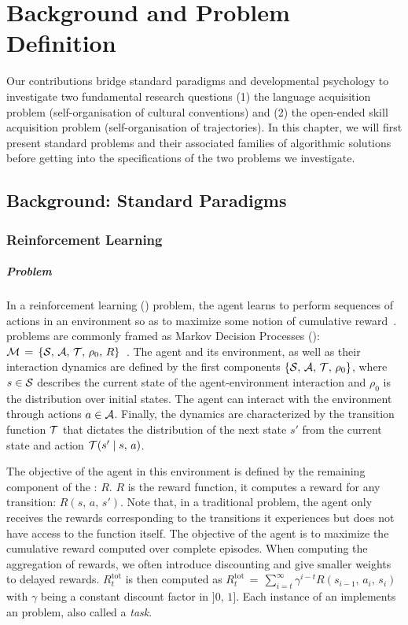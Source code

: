 \chapter{Background and Problem Definition}
\label{chap:backgroud}
\adjustmtc
\minitoc

Our contributions bridge standard \ai paradigms and developmental psychology to investigate two fundamental research questions  (1) the language acquisition problem (self-organisation of cultural conventions) and (2) the open-ended skill acquisition problem (self-organisation of trajectories). In this chapter, we will first present standard \ai problems and their associated families of algorithmic solutions before getting into the specifications of the two problems we investigate.

\section{Background: Standard \ai Paradigms}



\subsection{Reinforcement Learning}

\paragraph{Problem}

In a reinforcement learning (\rl) problem, the agent learns to perform sequences of actions in an environment so as to maximize some notion of cumulative reward~\citep{sutton2018reinforcement}. \rl problems are commonly framed as Markov Decision Processes (\mdps): $\mathcal{M}\,=\,\{\mathcal{S},\,\mathcal{A},\,\mathcal{T},\,\rho_0,\,R\}$~\citep{sutton2018reinforcement}. The agent and its environment, as well as their interaction dynamics are defined by the first components $\{\mathcal{S},\,\mathcal{A},\,\mathcal{T},\,\rho_0\}$, where $s\in\mathcal{S}$ describes the current state of the agent-environment interaction and $\rho_0$ is the distribution over initial states. The agent can interact with the environment through actions $a\in\mathcal{A}$. Finally, the dynamics are characterized by the transition function $\mathcal{T}$ that dictates the distribution of the next state $s'$ from the current state and action $\mathcal{T} (s'\mid s,\,a)$. 

The objective of the agent in this environment is defined by the remaining component of the \mdp: $R$. $R$ is the reward function, it computes a reward for any transition: $R(s,\,a,\,s')$. Note that, in a traditional \rl problem, the agent only receives the rewards corresponding to the transitions it experiences but does not have access to the function itself. The objective of the agent is to maximize the cumulative reward computed over complete episodes. When computing the aggregation of rewards, we often introduce discounting and give smaller weights to delayed rewards. $R^\text{tot}_t$ is then computed as $R^\text{tot}_t\,=\,\sum_{i=t}^\infty \gamma^{i-t}  R(s_{i-1},\,a_i,\,s_i)$ with $\gamma$ being a constant discount factor in $]0,\,1]$. Each instance of an \mdp implements an \rl problem, also called a \textit{task}.


